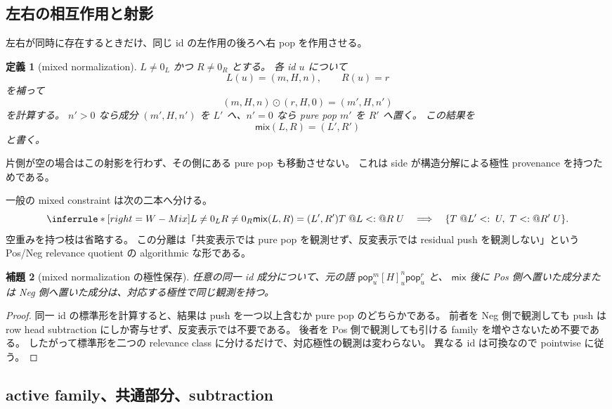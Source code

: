 \documentclass[uplatex,dvipdfmx,a4paper,10.5pt]{jsarticle}
\makeatletter
\theoremstyle{jpplain}
\newtheorem{definition}{定義}[section]
\newtheorem{lemma}[definition]{補題}
\newcommand{\mix}{\mathsf{mix}}
\newcommand{\takeop}[2]{[#1]_{#2}}
\newcommand{\popop}[1]{\mathsf{pop}_{#1}}
\newcommand{\wsub}[4]{#1\;@#2\mathrel{<:}@#3\;#4}
\newcommand{\lsub}[3]{#1\;@#2\mathrel{<:}\;#3}
\newcommand{\rsub}[3]{#1\mathrel{<:}@#2\;#3}
\makeatother
\begin{document}
\subsection{左右の相互作用と射影}

左右が同時に存在するときだけ、同じ id の左作用の後ろへ右 pop を作用させる。

\begin{definition}[mixed normalization]
$L\neq0_L$ かつ $R\neq0_R$ とする。
各 id $u$ について
\[
  L(u)=(m,H,n),\qquad R(u)=r
\]
を補って
\[
  (m,H,n)\odot(r,H,0)=(m',H,n')
\]
を計算する。
$n'>0$ なら成分 $(m',H,n')$ を $L'$ へ、$n'=0$ なら pure pop $m'$ を $R'$ へ置く。
この結果を
\[
  \mix(L,R)=(L',R')
\]
と書く。
\end{definition}

片側が空の場合はこの射影を行わず、その側にある pure pop も移動させない。
これは side が構造分解による極性 provenance を持つためである。

\begin{formalbox}
一般の mixed constraint は次の二本へ分ける。
\[
\inferrule*[right=W-Mix]
 {L\neq0_L\\R\neq0_R\\\mix(L,R)=(L',R')}
 {\wsub{T}{L}{R}{U}\quad\Longrightarrow\quad
  \{\lsub{T}{L'}{U},\ \rsub{T}{R'}{U}\}.}
\]
空重みを持つ枝は省略する。
この分離は「共変表示では pure pop を観測せず、反変表示では residual push を観測しない」という
Pos/Neg relevance quotient の algorithmic な形である。
\end{formalbox}

\begin{lemma}[mixed normalization の極性保存]
任意の同一 id 成分について、元の語
$\popop{u}^{m}\takeop{H}{u}^{n}\popop{u}^{r}$ と、
$\mix$ 後に Pos 側へ置いた成分または Neg 側へ置いた成分は、対応する極性で同じ観測を持つ。
\end{lemma}

\begin{proof}
同一 id の標準形を計算すると、結果は push を一つ以上含むか pure pop のどちらかである。
前者を Neg 側で観測しても push は row head subtraction にしか寄与せず、反変表示では不要である。
後者を Pos 側で観測しても引ける family を増やさないため不要である。
したがって標準形を二つの relevance class に分けるだけで、対応極性の観測は変わらない。
異なる id は可換なので pointwise に従う。
\end{proof}

\subsection{active family、共通部分、subtraction}
\end{document}
